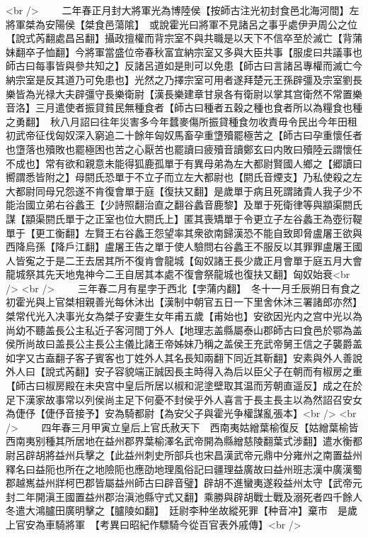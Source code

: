 <br />
　　二年春正月封大將軍光為博陸侯【按師古注光初封食邑北海河間】左將軍桀為安陽侯【桀食邑蕩隂】　或說霍光曰將軍不見諸呂之事乎處伊尹周公之位【說式芮翻處昌呂翻】攝政擅權而背宗室不與共職是以天下不信卒至於滅亡【背蒲妹翻卒子恤翻】今將軍當盛位帝春秋富宜納宗室又多與大臣共事【服䖍曰共議事也師古曰每事皆與參共知之】反諸呂道如是則可以免患【師古曰言諸呂專權而滅亡今納宗室是反其道乃可免患也】光然之乃擇宗室可用者遂拜楚元王孫辟彊及宗室劉長樂皆為光禄大夫辟彊守長樂衛尉【漢長樂建章甘泉各有衛尉以掌其宫衛然不常置樂音洛】三月遣使者振貸貧民無種食者【師古曰種者五穀之種也食者所以為糧食也種之勇翻】　秋八月詔曰往年災害多今年蠺麥傷所振貸種食勿收責毋令民出今年田租　初武帝征伐匈奴深入窮追二十餘年匈奴馬畜孕重墯殰罷極苦之【師古曰孕重懷任者也墯落也殰敗也罷極困也苦之心厭苦也罷讀曰疲殰音讀鄭玄曰内敗曰殰陸云謂懷任不成也】常有欲和親意未能得狐鹿孤單于有異母弟為左大都尉賢國人鄉之【郷讀曰嚮謂悉皆附之】母閼氏恐單于不立子而立左大都尉也【閼氏音煙支】乃私使殺之左大都尉同母兄怨遂不肯復會單于庭【復扶又翻】是歲單于病且死謂諸貴人我子少不能治國立弟右谷蠡王【少詩照翻治直之翻谷蠡音鹿黎】及單于死衛律等與顓渠閼氏謀【顓渠閼氏單于之正室也位大閼氏上】匿其喪矯單于令更立子左谷蠡王為壺衍鞮單于【更工衡翻】左賢王右谷蠡王怨望率其衆欲南歸漢恐不能自致即脅盧屠王欲與西降烏孫【降戶江翻】盧屠王告之單于使人驗問右谷蠡王不服反以其罪罪盧屠王國人皆寃之于是二王去居其所不復肯會龍城【匈奴諸王長少歲正月會單于庭五月大會龍城祭其先天地鬼神今二王自居其本處不復會祭龍城也復扶又翻】匈奴始衰<br />
<br />
　　三年春二月有星孛于西北【孛蒲内翻】　冬十一月壬辰朔日有食之　初霍光與上官桀相親善光每休沐出【漢制中朝官五日一下里舍休沐三署諸郎亦然】桀常代光入决事光女為桀子安妻生女年甫五歲【甫始也】安欲因光内之宫中光以為尚幼不聽盖長公主私近子客河間丁外人【地理志盖縣屬泰山郡師古曰食邑於鄂為盖侯所尚故曰盖長公主長公主儀比諸王帝姊妹乃稱之盖侯王充武帝舅王信之子襲爵盖如字又古盍翻子客子賓客也丁姓外人其名長知兩翻下同近其靳翻】安素與外人善說外人曰【說式芮翻】安子容貌端正誠因長主時得入為后以臣父子在朝而有椒房之重【師古曰椒房殿在未央宫中皇后所居以椒和泥塗壁取其温而芳朝直遥反】成之在於足下漢家故事常以列侯尚主足下何憂不封侯乎外人喜言于長主長主以為然詔召安女為倢伃【倢伃音接予】安為騎都尉【為安父子與霍光争權謀亂張本】<br />
<br />
　　四年春三月甲寅立皇后上官氏赦天下　西南夷姑繒葉榆復反【姑繒葉榆皆西南夷别種其所居地在益州郡界葉榆澤名武帝開為縣繒慈陵翻葉式涉翻】遣水衡都尉呂辟胡將益州兵擊之【此益州刺史所部兵也宋昌漢武帝元鼎中分雍州之南置益州釋名曰益阨也所在之地險阨也應劭地理風俗記曰疆理益廣故曰益州班志漢中廣漢蜀郡越嶲益州牂柯巴郡皆屬益州師古曰辟音璧】辟胡不進蠻夷遂殺益州太守【武帝元封二年開滇王國置益州郡治滇池縣守式又翻】乘勝與辟胡戰士戰及溺死者四千餘人冬遣大鴻臚田廣明擊之【臚陵如翻】　廷尉李种坐故縱死罪【种音冲】棄市　是歲上官安為車騎將軍　【考異曰昭紀作驃騎今從百官表外戚傳】<br />
